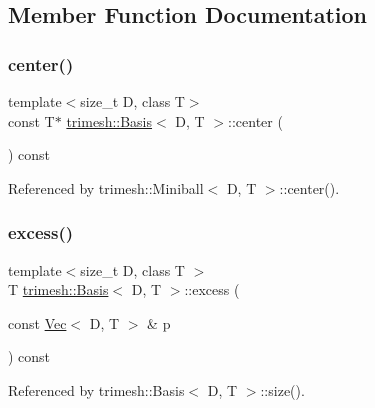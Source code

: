 \subsection{Member Function Documentation}
\mbox{\label{classtrimesh_1_1Basis_a2af24b4e2a734c790675c0e8e3a596f1}} 
\subsubsection{\texorpdfstring{center()}{center()}}
{\footnotesize\ttfamily template$<$size\+\_\+t D, class T$>$ \\
const T$\ast$ \hyperlink{classtrimesh_1_1Basis}{trimesh\+::\+Basis}$<$ D, T $>$\+::center (\begin{DoxyParamCaption}{ }\end{DoxyParamCaption}) const\hspace{0.3cm}{\ttfamily [inline]}}



Referenced by trimesh\+::\+Miniball$<$ D, T $>$\+::center().

\mbox{\label{classtrimesh_1_1Basis_a43fa98abe1d7a2d8636ecb662af75d56}} 
\subsubsection{\texorpdfstring{excess()}{excess()}}
{\footnotesize\ttfamily template$<$size\+\_\+t D, class T $>$ \\
T \hyperlink{classtrimesh_1_1Basis}{trimesh\+::\+Basis}$<$ D, T $>$\+::excess (\begin{DoxyParamCaption}\item[{const \hyperlink{classtrimesh_1_1Vec}{Vec}$<$ D, T $>$ \&}]{p }\end{DoxyParamCaption}) const}



Referenced by trimesh\+::\+Basis$<$ D, T $>$\+::size().

\mbox{\label{classtrimesh_1_1Basis_a617b8507dc31a31a3dc10a5a558203ad}} 
